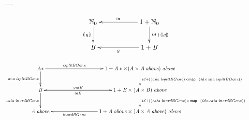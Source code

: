 \documentclass[a4paper]{article}
\newcommand{\Conid}[1]{\mathit{#1}}
\newcommand{\Varid}[1]{\mathit{#1}}
\begin{document}
----

\begin{eqnarray*}
\xymatrix@C=2cm{
    \ensuremath{\N_0}
           \ar[d]_-{\ensuremath{\cata{\Varid{g}}}}
&
    \ensuremath{\mathrm{1}\mathbin{+}\N_0}
           \ar[d]^{\ensuremath{\Varid{id}\mathbin{+}\cata{\Varid{g}}}}
           \ar[l]_-{\ensuremath{\mathsf{in}}}
\\
     \ensuremath{\mathit B}
&
     \ensuremath{\mathrm{1}\mathbin{+}\mathit B}
           \ar[l]^-{\ensuremath{\Varid{g}}}
}
\end{eqnarray*}




\begin{eqnarray*}
\xymatrix@C=3cm{
   \ensuremath{\Conid{A}\mathbin{*}}
          \ar[d]_-{\ensuremath{\Varid{ana}\;\Varid{lsplitBGene}}}
           \ar[r]^-{\ensuremath{\Varid{lsplitBGene}}}
&
   \ensuremath{\mathrm{1}\mathbin{+}\Conid{A}\mathbin{*}\times(\Conid{A}\times\Conid{A}\;\Varid{above})\;\Varid{above}}
          \ar[d]^{\ensuremath{\Varid{id}\mathbin{+}((\Varid{ana}\;\Varid{lsplitBGene})\times\map \;(\Varid{id}\times\Varid{ana}\;\Varid{lsplitBGene}))}}
\\
    \ensuremath{\mathit B}
       \ar[d]_-{\ensuremath{\Varid{cata}\;\Varid{inordBGene}}}
       \ar[r]^-{\ensuremath{\Varid{outB}}}
&
    \ensuremath{\mathrm{1}\mathbin{+}\mathit B\times(\Conid{A}\times\mathit B)\;\Varid{above}}
          \ar[l]^-{\ensuremath{\Varid{inB}}}
           \ar[d]^{\ensuremath{\Varid{id}\mathbin{+}((\Varid{cata}\;\Varid{inordBGene})\times\map \;(\Varid{id}\times\Varid{cata}\;\Varid{inordBGene}))}}
\\
   \ensuremath{\Conid{A}\;\Varid{above}}
&
   \ensuremath{\mathrm{1}\mathbin{+}\Conid{A}\;\Varid{above}\times(\Conid{A}\times\Conid{A}\;\Varid{above})\;\Varid{above}}
       \ar[l]^-{\ensuremath{\Varid{inordBGene}}}
}
\end{eqnarray*}
\end{document}
